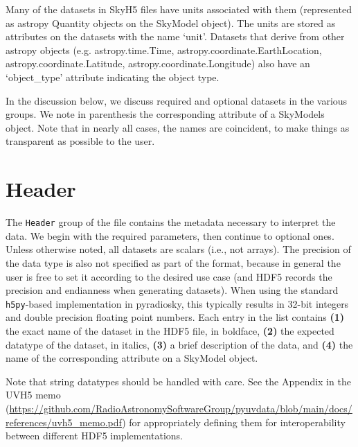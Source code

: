 \documentclass[11pt, oneside]{article}
\begin{document}
Many of the datasets in SkyH5 files have units associated with them (represented as astropy Quantity objects on the SkyModel object).
The units are stored as attributes on the datasets with the name `unit'.
Datasets that derive from other astropy objects (e.g. astropy.time.Time,
astropy.coordinate.EarthLocation, astropy.coordinate.Latitude, astropy.coordinate.Longitude)
also have an `object\_type' attribute indicating the object type.

In the discussion below, we discuss required and optional datasets in the
various groups. We note in parenthesis the corresponding attribute of a SkyModels
object. Note that in nearly all cases, the names are coincident, to make things
as transparent as possible to the user.

\section{Header}
\label{sec:header}
The \verb+Header+ group of the file contains the metadata necessary to interpret
the data. We begin with the required parameters, then continue to optional
ones. Unless otherwise noted, all datasets are scalars (i.e., not arrays). The
precision of the data type is also not specified as part of the format, because
in general the user is free to set it according to the desired use case (and
HDF5 records the precision and endianness when generating datasets). When using
the standard \verb+h5py+-based implementation in pyradiosky, this typically
results in 32-bit integers and double precision floating point numbers. Each
entry in the list contains \textbf{(1)} the exact name of the dataset in the
HDF5 file, in boldface, \textbf{(2)} the expected datatype of the dataset, in
italics, \textbf{(3)} a brief description of the data, and \textbf{(4)} the name
of the corresponding attribute on a SkyModel object.

Note that string datatypes should be handled with care. See
the Appendix in the UVH5 memo (\url{https://github.com/RadioAstronomySoftwareGroup/pyuvdata/blob/main/docs/references/uvh5_memo.pdf})
for appropriately defining them for interoperability between different HDF5 implementations.
\end{document}
